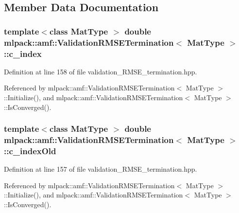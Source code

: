 \subsection{Member Data Documentation}
\subsubsection[{c\-\_\-index}]{\setlength{\rightskip}{0pt plus 5cm}template$<$class Mat\-Type $>$ double {\bf mlpack\-::amf\-::\-Validation\-R\-M\-S\-E\-Termination}$<$ Mat\-Type $>$\-::c\-\_\-index\hspace{0.3cm}{\ttfamily [private]}}\label{classmlpack_1_1amf_1_1ValidationRMSETermination_ab3f28da1cbdce64962526cb8d42c7b35}


Definition at line 158 of file validation\-\_\-\-R\-M\-S\-E\-\_\-termination.\-hpp.



Referenced by mlpack\-::amf\-::\-Validation\-R\-M\-S\-E\-Termination$<$ Mat\-Type $>$\-::\-Initialize(), and mlpack\-::amf\-::\-Validation\-R\-M\-S\-E\-Termination$<$ Mat\-Type $>$\-::\-Is\-Converged().

\subsubsection[{c\-\_\-index\-Old}]{\setlength{\rightskip}{0pt plus 5cm}template$<$class Mat\-Type $>$ double {\bf mlpack\-::amf\-::\-Validation\-R\-M\-S\-E\-Termination}$<$ Mat\-Type $>$\-::c\-\_\-index\-Old\hspace{0.3cm}{\ttfamily [private]}}\label{classmlpack_1_1amf_1_1ValidationRMSETermination_ad77132ce1ebf4e46a8c379f0550ccf75}


Definition at line 157 of file validation\-\_\-\-R\-M\-S\-E\-\_\-termination.\-hpp.



Referenced by mlpack\-::amf\-::\-Validation\-R\-M\-S\-E\-Termination$<$ Mat\-Type $>$\-::\-Initialize(), and mlpack\-::amf\-::\-Validation\-R\-M\-S\-E\-Termination$<$ Mat\-Type $>$\-::\-Is\-Converged().

